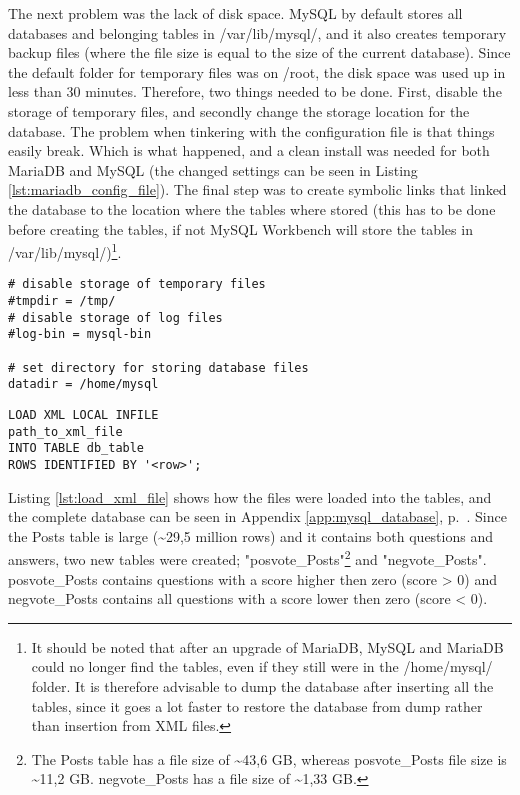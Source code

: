 \noindent
The next problem was the lack of disk space. MySQL by default stores all databases and belonging tables in 
/var/lib/mysql/, and it also creates temporary backup files (where the file size is equal to the size of the 
current database). Since the default folder for temporary files was on /root, the disk space was used up in 
less than 30 minutes. Therefore, two things needed to be done. First, disable the storage of temporary files, 
and secondly change the storage location for the database. The problem when tinkering with the configuration 
file is that things easily break. Which is what happened, and a clean install was needed for both 
MariaDB and MySQL (the changed settings can be seen in Listing  \ref{lst:mariadb_config_file}). The final step 
was to create symbolic links that linked the database to the  location where the tables where stored (this 
has to be done before creating the tables, if not MySQL  Workbench will store the tables in 
/var/lib/mysql/)\footnote{It should be noted that after an upgrade of MariaDB, MySQL and MariaDB could no 
longer find the tables, even if they still were in the /home/mysql/ folder. It is therefore advisable to dump 
the database after inserting all the tables, since it goes a lot faster to restore the database from dump 
rather than insertion from XML files.}. 
\begin{lstlisting}[caption={Changes made to config file: /etc/mysql/my.cnf}, label={lst:mariadb_config_file}] 
# disable storage of temporary files
#tmpdir = /tmp/		  
# disable storage of log files
#log-bin = mysql-bin  

# set directory for storing database files
datadir = /home/mysql 
\end{lstlisting}

\begin{lstlisting}[caption={Load XML file into a table in the MySQL database}, label={lst:load_xml_file}] 
LOAD XML LOCAL INFILE 
path_to_xml_file
INTO TABLE db_table
ROWS IDENTIFIED BY '<row>';
\end{lstlisting}

\noindent
Listing \ref{lst:load_xml_file} shows how the files were loaded into the tables, and the complete database can 
be seen in Appendix \ref{app:mysql_database}, p.~\pageref{app:mysql_database}. Since the Posts table is large 
(\textasciitilde 29,5 million rows) and it contains both questions and answers, two new tables were created; 
"posvote\_Posts"\footnote{The Posts table has a file size of \textasciitilde 43,6 GB, whereas posvote\_Posts file 
	size is \textasciitilde 11,2 GB. negvote\_Posts has a file size of \textasciitilde 1,33 GB.} and 
"negvote\_Posts". posvote\_Posts contains questions with a score higher then zero (score > 0) and negvote\_Posts 
contains all questions with a score lower then zero (score < 0).

